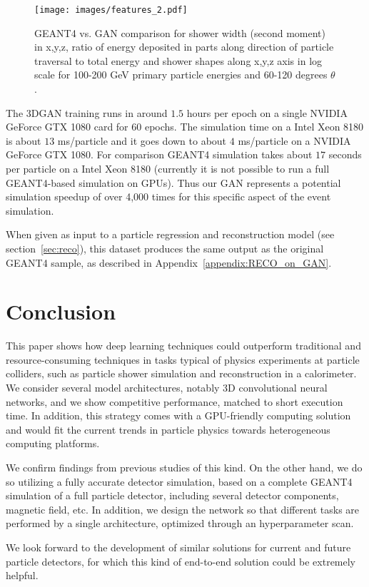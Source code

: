 \begin{figure}
    \centering
    \texttt{[image: images/features\_2.pdf]}
    \caption{GEANT4 vs. GAN comparison for shower width (second
      moment) in x,y,z, ratio of energy deposited in parts along
      direction of particle traversal to total energy and shower
      shapes along x,y,z axis in log scale for 100-200 GeV primary
      particle energies and 60-120 degrees $\theta$.
      \label{fig:GAN_features2}}
\end{figure}

The 3DGAN training runs in around $1.5$ hours per epoch on a single NVIDIA GeForce GTX 1080 card for $60$ epochs. The simulation  time  on a Intel  Xeon 8180  is about $13$ ms/particle  and it goes down to about $4$ ms/particle on a NVIDIA  GeForce  GTX  1080. For  comparison  GEANT4  simulation takes  about $17$ seconds  per  particle on  a  Intel  Xeon  8180 (currently  it  is  not  possible  to  run a full  GEANT4-based  simulation  on  GPUs). Thus our GAN represents a potential simulation speedup of over 4,000 times for this specific aspect of the event simulation.

When given as input to a particle regression and reconstruction model (see section~\ref{sec:reco}), this dataset produces the same output as the original GEANT4 sample, as described in Appendix~\ref{appendix:RECO_on_GAN}.

\chapter{Conclusion}

This paper shows how deep learning techniques could outperform traditional and resource-consuming techniques in  tasks typical of physics experiments at particle colliders, such as particle shower simulation and reconstruction in a calorimeter.
We consider several model architectures, notably 3D convolutional neural networks, and we show competitive performance, matched to short execution time. In addition, this strategy comes with a GPU-friendly computing solution and would fit the current trends in particle physics towards heterogeneous computing platforms. 

We confirm findings from previous studies of this kind. On the other hand, we do so utilizing a fully accurate detector simulation, based on a complete GEANT4 simulation of a full particle detector, including several detector components, magnetic field, etc. In addition, we design the network so that different tasks are performed by a single architecture, optimized through an hyperparameter scan. 

We look forward to the development of similar solutions for current and future particle detectors, for which this kind of end-to-end solution could be extremely helpful. 